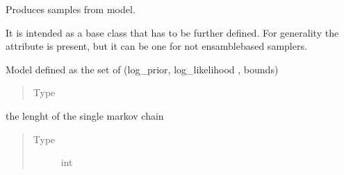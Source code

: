 \documentclass[letterpaper,10pt,english,openany,oneside]{sphinxmanual}
\begin{document}

\begin{fulllineitems}
\label{\detokenize{autogen:samplers.Sampler}}
Produces samples from model.

It is intended as a base class that has to be further defined.
For generality the attribute  is present, but it can be one for not ensamble\sphinxhyphen{}based samplers.

\begin{fulllineitems}
\label{\detokenize{autogen:samplers.Sampler.model}}
Model defined as the set of (log\_prior, log\_likelihood , bounds)
\begin{quote}\begin{description}
\item[{Type}] \leavevmode
{\hyperref[\detokenize{autogen:model.Model}]{}}

\end{description}\end{quote}

\end{fulllineitems}


\begin{fulllineitems}
\label{\detokenize{autogen:samplers.Sampler.mcmc_lenght}}
the lenght of the single markov chain
\begin{quote}\begin{description}
\item[{Type}] \leavevmode
int

\end{description}\end{quote}

\end{fulllineitems}



\end{fulllineitems}
\end{document}
